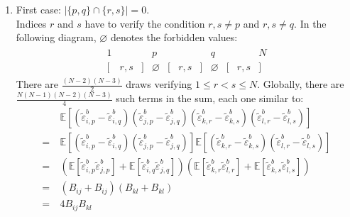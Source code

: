 \documentclass[12pt]{scrartcl}
\begin{document}
\begin{enumerate}
\item First case: $|\{p,q\} \cap \{r,s\}| = 0$.\\
Indices $r$ and $s$ have to verify the condition $r,s \ne p$ and $r,s \ne q$. In the following diagram, $\varnothing$ denotes the forbidden values:
\begin{align}
\begin{array}{ccccccccccc}
1 & & & p & & & & q & & & N \\
\big[ & r,s & \big] & \varnothing & \big[ & r,s & \big] & \varnothing & \big[ & r,s & \big] \nonumber
\end{array}
\end{align}
There are $\displaystyle \frac{(N-2)(N-3)}{2}$ draws verifying $1 \le r < s \le N$. Globally, there are \\$\displaystyle \frac{N(N-1)(N-2)(N-3)}{4}$ such terms in the sum, each one similar to:
\begin{align}
& \mathbb{E}\left[\left(\widetilde{\varepsilon}^b_{i,p} - \widetilde{\varepsilon}^b_{i,q}\right) \left(\widetilde{\varepsilon}^b_{j,p} - \widetilde{\varepsilon}^b_{j,q}\right) \left(\widetilde{\varepsilon}^b_{k,r} - \widetilde{\varepsilon}^b_{k,s}\right) \left(\widetilde{\varepsilon}^b_{l,r} - \widetilde{\varepsilon}^b_{l,s}\right) \right] \nonumber \\
= \ & \mathbb{E}\left[\left(\widetilde{\varepsilon}^b_{i,p} - \widetilde{\varepsilon}^b_{i,q}\right) \left(\widetilde{\varepsilon}^b_{j,p} - \widetilde{\varepsilon}^b_{j,q}\right)\right] \mathbb{E}\left[ \left(\widetilde{\varepsilon}^b_{k,r} - \widetilde{\varepsilon}^b_{k,s}\right) \left(\widetilde{\varepsilon}^b_{l,r} - \widetilde{\varepsilon}^b_{l,s}\right)\right]  \nonumber \\
= \ & \left(\mathbb{E}\left[\widetilde{\varepsilon}^b_{i,p} \widetilde{\varepsilon}^b_{j,p}\right] + \mathbb{E}\left[\widetilde{\varepsilon}^b_{i,q} \widetilde{\varepsilon}^b_{j,q}\right]\right) \left(\mathbb{E}\left[\widetilde{\varepsilon}^b_{k,r} \widetilde{\varepsilon}^b_{l,r}\right] + \mathbb{E}\left[\widetilde{\varepsilon}^b_{k,s} \widetilde{\varepsilon}^b_{l,s}\right]\right) \nonumber \\
= \ & \left(B_{ij} + B_{ij}\right) \left(B_{kl} + B_{kl}\right) \nonumber \\
= \ & 4 B_{ij} B_{kl}
\end{align}


\end{enumerate}
\end{document}
